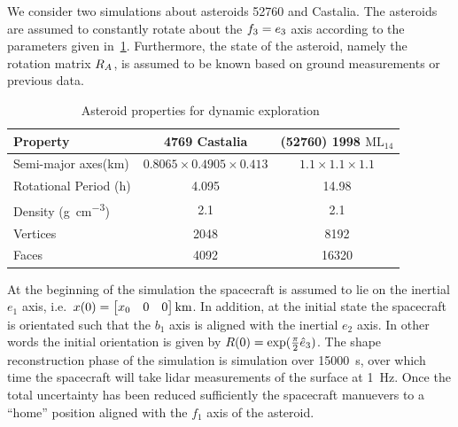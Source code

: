 We consider two simulations about asteroids \num{52760} and Castalia.
The asteroids are assumed to constantly rotate about the \( f_3 = e_3\) axis according to the parameters given in~\cref{tab:dynamic_asteroids}.
Furthermore, the state of the asteroid, namely the rotation matrix \( R_A \), is assumed to be known based on ground measurements or previous data.
\begin{table}[htbp]
    \centering
    \begin{tabular}{lcc}
        \toprule
        Property & \num{4769} Castalia & (\num{52760}) \num{1998} \(\text{ML}_{14}\) \\
        \midrule
        Semi-major axes(\si{\kilo\meter}) & \( 0.8065 \times 0.4905 \times 0.413 \) & \( 1.1 \times 1.1 \times 1.1 \) \\
        Rotational Period (\si{\hour}) & \num{4.095} & \num{14.98} \\
        Density (\si{\gram\per\centi\meter^3}) & \num{2.1} & \num{2.1} \\
        Vertices & \num{2048}  & \num{8192} \\
        Faces & \num{4092} & \num{16320} \\
        \bottomrule
    \end{tabular}
    \caption{Asteroid properties for dynamic exploration~\label{tab:dynamic_asteroids}}
\end{table}
At the beginning of the simulation the spacecraft is assumed to lie on the inertial \( e_1 \) axis, i.e.\ \( x(0) = \begin{bmatrix} x_0 & 0 & 0 \end{bmatrix} \si{\kilo\meter} \).
In addition, at the initial state the spacecraft is orientated such that the \( b_1 \) axis is aligned with the inertial \( e_2 \) axis.
In other words the initial orientation is given by \( R(0) = \exp(\frac{\pi}{2} \hat{e}_3)\).
The shape reconstruction phase of the simulation is simulation over \SI{15000}{\second}, over which time the spacecraft will take \gls{lidar} measurements of the surface at \SI{1}{\hertz}.
Once the total uncertainty has been reduced sufficiently the spacecraft manuevers to a ``home'' position aligned with the \( f_1 \) axis of the asteroid.


